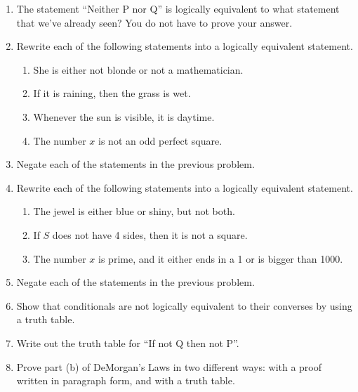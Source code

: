 \probsec{~\ref{sec:negat-logic-equiv}}
\begin{enumerate}
    \item The statement ``Neither P nor Q'' is logically equivalent to what statement that we've already seen? You do not have to prove your answer.

    \item Rewrite each of the following statements into a logically equivalent statement.
  \begin{enumerate}
      \item She is either not blonde or not a mathematician.
      \item If it is raining, then the grass is wet.
      \item Whenever the sun is visible, it is daytime.
      \item The number $x$ is not an odd perfect square.
  \end{enumerate}

    \item Negate each of the statements in the previous problem.

    \item Rewrite each of the following statements into a logically equivalent statement.
  \begin{enumerate}
      \item The jewel is either blue or shiny, but not both.
      \item If $S$ does not have 4 sides, then it is not a square.
      \item The number $x$ is prime, and it either ends in a 1 or is
    bigger than 1000.
  \end{enumerate}

    \item Negate each of the statements in the previous problem.

    \item Show that conditionals are not logically equivalent to their converses by using a truth table.

    \item Write out the truth table for ``If not Q then not P''.

    \item Prove part (b) of DeMorgan's Laws in two different ways: with a proof written in paragraph form, and with a truth table.


\end{enumerate}

